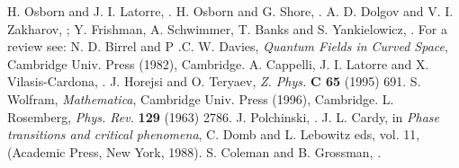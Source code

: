 \documentclass[11pt]{article}
\begin{document}
\begin{thebibliography}{99}
  H. Osborn and J. I. Latorre, .
  H. Osborn and G. Shore, .
 A. D. Dolgov and V. I. Zakharov, ;
              Y. Frishman, A. Schwimmer, T. Banks and S. Yankielowicz, 
              .
  For a review see:  
              N. D. Birrel and P .C. W. Davies, {\it Quantum Fields 
            in Curved Space}, Cambridge Univ. Press (1982), Cambridge.  
 A. Cappelli, J. I. Latorre and X. Vilasis-Cardona,
              .
 J. Horejsi and O. Teryaev,
              {\it Z. Phys.} {\bf C 65} (1995) 691.
 S. Wolfram, {\it Mathematica}, Cambridge Univ. Press (1996),
              Cambridge.
 L. Rosemberg, {\it Phys. Rev.} {\bf 129} (1963) 2786.
 J. Polchinski, .
 J. L. Cardy, in {\it Phase transitions and critical
                phenomena}, C. Domb and L. Lebowitz eds, vol. 11,
                (Academic Press, New York, 1988).
 S. Coleman and B. Grossman, .
\end{thebibliography} 
\end{document}
